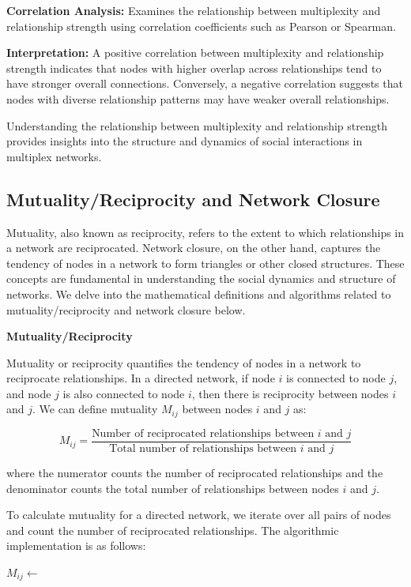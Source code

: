 \documentclass[12pt]{book} %
\begin{document}
\textbf{Correlation Analysis:} Examines the relationship between multiplexity and relationship strength using correlation coefficients such as Pearson or Spearman.

\textbf{Interpretation:} A positive correlation between multiplexity and relationship strength indicates that nodes with higher overlap across relationships tend to have stronger overall connections. Conversely, a negative correlation suggests that nodes with diverse relationship patterns may have weaker overall relationships.

Understanding the relationship between multiplexity and relationship strength provides insights into the structure and dynamics of social interactions in multiplex networks.


\subsection{Mutuality/Reciprocity and Network Closure}

Mutuality, also known as reciprocity, refers to the extent to which relationships in a network are reciprocated. Network closure, on the other hand, captures the tendency of nodes in a network to form triangles or other closed structures. These concepts are fundamental in understanding the social dynamics and structure of networks. We delve into the mathematical definitions and algorithms related to mutuality/reciprocity and network closure below.

\textbf{Mutuality/Reciprocity}

Mutuality or reciprocity quantifies the tendency of nodes in a network to reciprocate relationships. In a directed network, if node \(i\) is connected to node \(j\), and node \(j\) is also connected to node \(i\), then there is reciprocity between nodes \(i\) and \(j\). We can define mutuality \(M_{ij}\) between nodes \(i\) and \(j\) as:

\[
M_{ij} = \frac{\text{{Number of reciprocated relationships between }} i \text{{ and }} j}{\text{{Total number of relationships between }} i \text{{ and }} j}
\]

where the numerator counts the number of reciprocated relationships and the denominator counts the total number of relationships between nodes \(i\) and \(j\).

To calculate mutuality for a directed network, we iterate over all pairs of nodes and count the number of reciprocated relationships. The algorithmic implementation is as follows:
\FloatBarrier
\begin{algorithm}[H]
\caption{Mutuality Calculation}
\begin{algorithmic}[1]
        \State $M_{ij} \gets$ 
    \EndFor
\EndFunction
\end{algorithmic}
\end{algorithm}
\FloatBarrier
\end{document}
